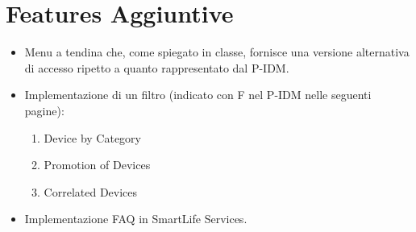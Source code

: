 \documentclass{article}
\begin{document}
	\section{Features Aggiuntive}
		\begin{itemize}
			\item Menu a tendina che, come spiegato in classe, fornisce una versione alternativa di accesso ripetto a quanto rappresentato dal P-IDM.
			\item Implementazione di un filtro (indicato con F nel P-IDM nelle seguenti pagine):
				\begin{enumerate}
					\item Device by Category
					\item Promotion of Devices
					\item Correlated Devices
				\end{enumerate}
			\item Implementazione FAQ in SmartLife Services.
		\end{itemize}
		
	
\end{document}
